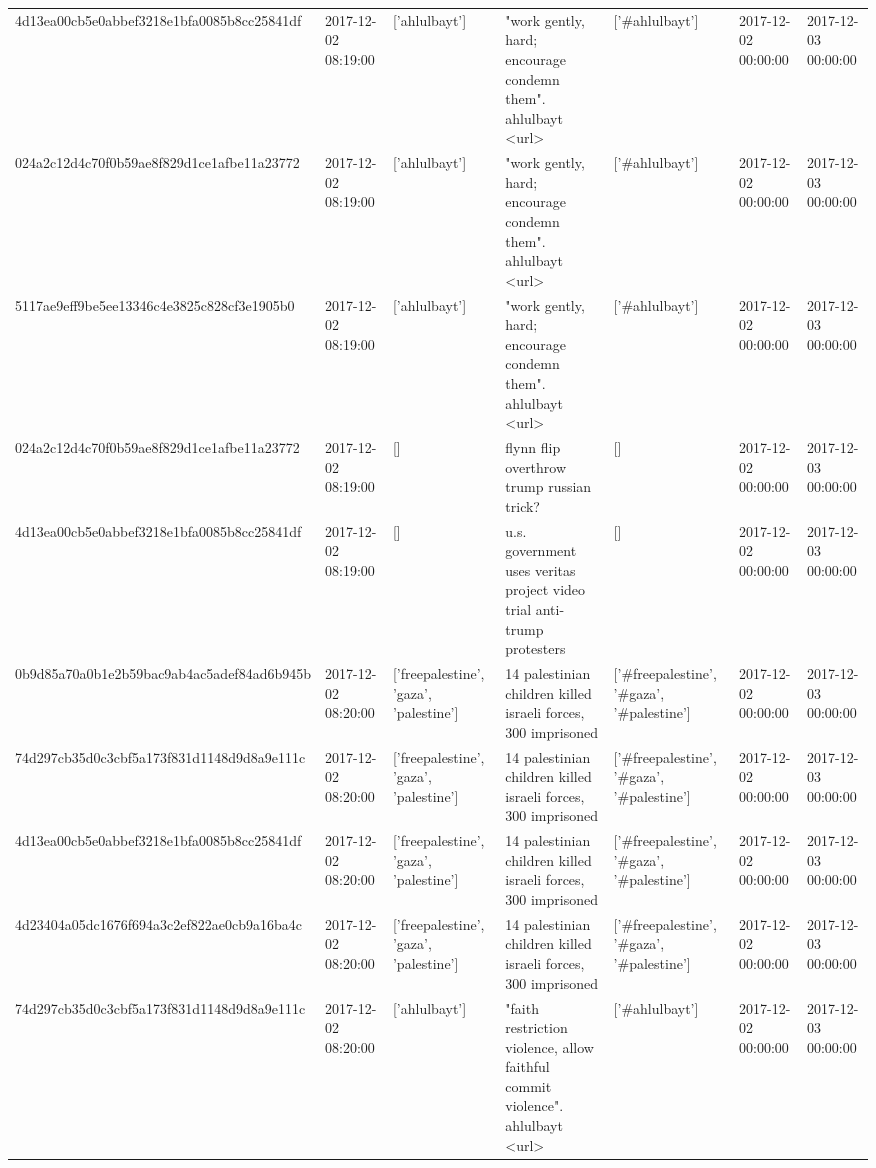 \begin{tabular}{lllllll}
4d13ea00cb5e0abbef3218e1bfa0085b8cc25841df & 2017-12-02 08:19:00 & ['ahlulbayt'] & "work gently, hard; encourage condemn them". ahlulbayt <url> & ['#ahlulbayt'] & 2017-12-02 00:00:00 & 2017-12-03 00:00:00 \\
024a2c12d4c70f0b59ae8f829d1ce1afbe11a23772 & 2017-12-02 08:19:00 & ['ahlulbayt'] & "work gently, hard; encourage condemn them". ahlulbayt <url> & ['#ahlulbayt'] & 2017-12-02 00:00:00 & 2017-12-03 00:00:00 \\
5117ae9eff9be5ee13346c4e3825c828cf3e1905b0 & 2017-12-02 08:19:00 & ['ahlulbayt'] & "work gently, hard; encourage condemn them". ahlulbayt <url> & ['#ahlulbayt'] & 2017-12-02 00:00:00 & 2017-12-03 00:00:00 \\
024a2c12d4c70f0b59ae8f829d1ce1afbe11a23772 & 2017-12-02 08:19:00 & [] & flynn flip overthrow trump russian trick? & [] & 2017-12-02 00:00:00 & 2017-12-03 00:00:00 \\
4d13ea00cb5e0abbef3218e1bfa0085b8cc25841df & 2017-12-02 08:19:00 & [] & u.s. government uses veritas project video trial anti-trump protesters & [] & 2017-12-02 00:00:00 & 2017-12-03 00:00:00 \\
0b9d85a70a0b1e2b59bac9ab4ac5adef84ad6b945b & 2017-12-02 08:20:00 & ['freepalestine', 'gaza', 'palestine'] & 14 palestinian children killed israeli forces, 300 imprisoned & ['#freepalestine', '#gaza', '#palestine'] & 2017-12-02 00:00:00 & 2017-12-03 00:00:00 \\
74d297cb35d0c3cbf5a173f831d1148d9d8a9e111c & 2017-12-02 08:20:00 & ['freepalestine', 'gaza', 'palestine'] & 14 palestinian children killed israeli forces, 300 imprisoned & ['#freepalestine', '#gaza', '#palestine'] & 2017-12-02 00:00:00 & 2017-12-03 00:00:00 \\
4d13ea00cb5e0abbef3218e1bfa0085b8cc25841df & 2017-12-02 08:20:00 & ['freepalestine', 'gaza', 'palestine'] & 14 palestinian children killed israeli forces, 300 imprisoned & ['#freepalestine', '#gaza', '#palestine'] & 2017-12-02 00:00:00 & 2017-12-03 00:00:00 \\
4d23404a05dc1676f694a3c2ef822ae0cb9a16ba4c & 2017-12-02 08:20:00 & ['freepalestine', 'gaza', 'palestine'] & 14 palestinian children killed israeli forces, 300 imprisoned & ['#freepalestine', '#gaza', '#palestine'] & 2017-12-02 00:00:00 & 2017-12-03 00:00:00 \\
74d297cb35d0c3cbf5a173f831d1148d9d8a9e111c & 2017-12-02 08:20:00 & ['ahlulbayt'] & "faith restriction violence, allow faithful commit violence". ahlulbayt <url> & ['#ahlulbayt'] & 2017-12-02 00:00:00 & 2017-12-03 00:00:00 \\

\end{tabular}

